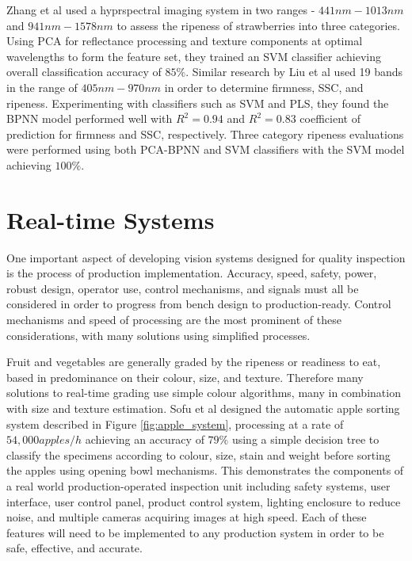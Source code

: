 \documentclass[fleqn,twoside,12pt]{report}
\begin{document}
Zhang et al \cite{zhang} used a hyprspectral imaging system in two ranges - $441nm-1013nm$ and $941nm-1578nm$ to assess the ripeness of strawberries into three categories. Using PCA for reflectance processing and texture components at optimal wavelengths to form the feature set, they trained an SVM classifier achieving overall classification accuracy of $85\%$. Similar research by Liu et al \cite{liu} used 19 bands in the range of $405nm-970nm$ in order to determine firmness, SSC, and ripeness. Experimenting with classifiers such as SVM and PLS, they found the BPNN model performed well with $R^2=0.94$ and $R^2=0.83$ coefficient of prediction for firmness and SSC, respectively. Three category ripeness evaluations were performed using both PCA-BPNN and SVM classifiers with the SVM model achieving $100\%$.

 




\section{Real-time Systems}

One important aspect of developing vision systems designed for quality inspection is the process of production implementation. Accuracy, speed, safety, power, robust design, operator use, control mechanisms, and signals must all be considered in order to progress from bench design to production-ready. Control mechanisms and speed of processing are the most prominent of these considerations, with many solutions using simplified processes.

Fruit and vegetables are generally graded by the ripeness or readiness to eat, based in predominance on their colour, size, and texture. Therefore many solutions to real-time grading use simple colour algorithms, many in combination with size and texture estimation. Sofu et al \cite{sofu} designed the automatic apple sorting system described in Figure \ref{fig:apple_system}, processing at a rate of $54,000 apples/h$ achieving an accuracy of $79\%$ using a simple decision tree to classify the specimens according to colour, size, stain and weight before sorting the apples using opening bowl mechanisms. This demonstrates the components of a real world production-operated inspection unit including safety systems, user interface, user control panel, product control system, lighting enclosure to reduce noise, and multiple cameras acquiring images at high speed. Each of these features will need to be implemented to any production system in order to be safe, effective, and accurate.
\end{document}
